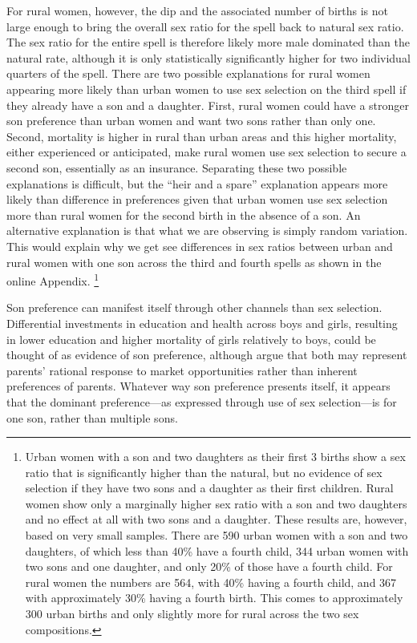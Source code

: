 \documentclass[12pt,letterpaper]{article}
\begin{document}
For rural women, however, the dip and the associated number of births is not
large enough to bring the overall sex ratio for the spell back to natural sex ratio.
The sex ratio for the entire spell is therefore likely more male dominated
than the natural rate, although it is only statistically significantly higher for two 
individual quarters of the spell.
There are two possible explanations for rural women appearing more likely than urban
women to use sex selection on the third spell if they already have a son and a daughter.
First, rural women could have a stronger son preference than urban women and want two sons 
rather than only one.
Second, mortality is higher in rural than urban areas and this higher mortality, either 
experienced or anticipated, make rural women use sex selection to secure a second son, 
essentially as an insurance.
Separating these two possible explanations is difficult, but the ``heir and a spare''
explanation appears  more likely than difference in preferences given that urban women use 
sex selection more than rural women for the second birth in the absence of a son.
An alternative explanation is that what we are observing is simply random variation.
This would explain why we get see differences in sex ratios between urban and rural
women with one son across the third and fourth spells as shown in the online Appendix.%
\footnote{
Urban women with a son and two daughters as their first 3 births show a sex ratio
that is significantly higher than the natural, but no evidence of sex
selection if they have two sons and a daughter as their first children.
Rural women show only a marginally higher sex ratio with a son and two daughters and no 
effect at all with two sons and a daughter.
These results are, however, based on very small samples.
There are 590 urban women with a son and two daughters, of which less than 40\% have a
fourth child, 344 urban women with two sons and one daughter, and only 20\% of those
have a fourth child.
For rural women the numbers are 564, with 40\% having a fourth child, and 367 with
approximately 30\% having a fourth birth.
This comes to approximately 300 urban births and only slightly more for rural across
the two sex compositions.
}

Son preference can manifest itself through other channels than sex selection.
Differential investments in education and health across boys and girls, resulting in
lower education and higher mortality of girls relatively to boys, could be thought 
of as evidence of son preference, although \cite{rosenzweig82} argue that both may 
represent parents' rational response to market opportunities rather than inherent 
preferences of parents.
Whatever way son preference presents itself, it appears that the dominant  
preference---as expressed through use of sex selection---is for one son, rather 
than multiple sons.
\end{document}
